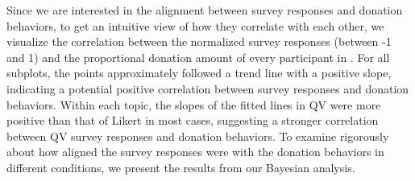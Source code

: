 Since we are interested in the alignment between survey responses and donation behaviors, to get an intuitive view of how they correlate with each other, we visualize the correlation between the normalized survey responses (between -1 and 1) and the proportional donation amount of every participant in . For all subplots, the points approximately followed a trend line with a positive slope, indicating a potential positive correlation between survey responses and donation behaviors. Within each topic, the slopes of the fitted lines in QV were more positive than that of Likert in most cases, suggesting a stronger correlation between QV survey responses and donation behaviors. To examine rigorously about how aligned the survey responses were with the donation behaviors in different conditions, we present the results from our Bayesian analysis.

